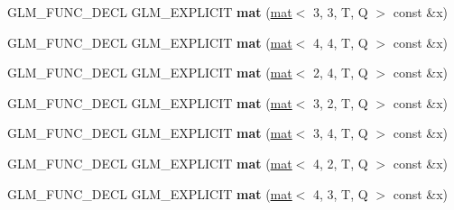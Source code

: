 \begin{DoxyCompactItemize}
G\+L\+M\+\_\+\+F\+U\+N\+C\+\_\+\+D\+E\+CL G\+L\+M\+\_\+\+E\+X\+P\+L\+I\+C\+IT {\bfseries mat} (\hyperlink{structglm_1_1mat}{mat}$<$ 3, 3, T, Q $>$ const \&x)
\item 
\mbox{\label{structglm_1_1mat_3_012_00_013_00_01T_00_01Q_01_4_a88e7a8abd441057ddb78bad66b87dff2}} 
G\+L\+M\+\_\+\+F\+U\+N\+C\+\_\+\+D\+E\+CL G\+L\+M\+\_\+\+E\+X\+P\+L\+I\+C\+IT {\bfseries mat} (\hyperlink{structglm_1_1mat}{mat}$<$ 4, 4, T, Q $>$ const \&x)
\item 
\mbox{\label{structglm_1_1mat_3_012_00_013_00_01T_00_01Q_01_4_afec5fad5a13f7fc482b6a69bd0538cc4}} 
G\+L\+M\+\_\+\+F\+U\+N\+C\+\_\+\+D\+E\+CL G\+L\+M\+\_\+\+E\+X\+P\+L\+I\+C\+IT {\bfseries mat} (\hyperlink{structglm_1_1mat}{mat}$<$ 2, 4, T, Q $>$ const \&x)
\item 
\mbox{\label{structglm_1_1mat_3_012_00_013_00_01T_00_01Q_01_4_aa0962c089c3ef6b0ff478957642d5737}} 
G\+L\+M\+\_\+\+F\+U\+N\+C\+\_\+\+D\+E\+CL G\+L\+M\+\_\+\+E\+X\+P\+L\+I\+C\+IT {\bfseries mat} (\hyperlink{structglm_1_1mat}{mat}$<$ 3, 2, T, Q $>$ const \&x)
\item 
\mbox{\label{structglm_1_1mat_3_012_00_013_00_01T_00_01Q_01_4_a593b7c82b35e2f1f806e7954ec940230}} 
G\+L\+M\+\_\+\+F\+U\+N\+C\+\_\+\+D\+E\+CL G\+L\+M\+\_\+\+E\+X\+P\+L\+I\+C\+IT {\bfseries mat} (\hyperlink{structglm_1_1mat}{mat}$<$ 3, 4, T, Q $>$ const \&x)
\item 
\mbox{\label{structglm_1_1mat_3_012_00_013_00_01T_00_01Q_01_4_afce3d4ebd4afeda8d49c9b253fb0bec3}} 
G\+L\+M\+\_\+\+F\+U\+N\+C\+\_\+\+D\+E\+CL G\+L\+M\+\_\+\+E\+X\+P\+L\+I\+C\+IT {\bfseries mat} (\hyperlink{structglm_1_1mat}{mat}$<$ 4, 2, T, Q $>$ const \&x)
\item 
\mbox{\label{structglm_1_1mat_3_012_00_013_00_01T_00_01Q_01_4_a44452ff247ae4f0724583011ab13880c}} 
G\+L\+M\+\_\+\+F\+U\+N\+C\+\_\+\+D\+E\+CL G\+L\+M\+\_\+\+E\+X\+P\+L\+I\+C\+IT {\bfseries mat} (\hyperlink{structglm_1_1mat}{mat}$<$ 4, 3, T, Q $>$ const \&x)
\item 

\end{DoxyCompactItemize}

